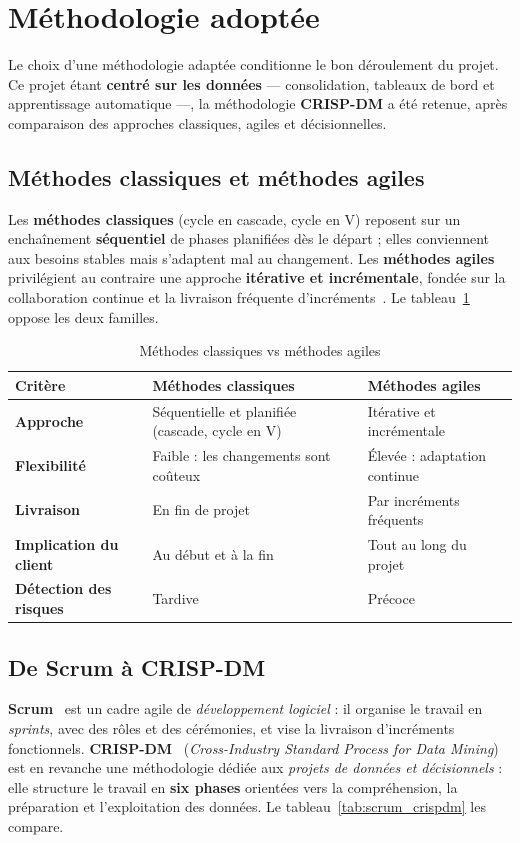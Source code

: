 \section{Méthodologie adoptée}
Le choix d'une méthodologie adaptée conditionne le bon déroulement du projet. Ce
projet étant \textbf{centré sur les données} --- consolidation, tableaux de bord et
apprentissage automatique ---, la méthodologie \textbf{CRISP-DM} a été retenue,
après comparaison des approches classiques, agiles et décisionnelles.

\subsection{Méthodes classiques et méthodes agiles}
Les \textbf{méthodes classiques} (cycle en cascade, cycle en V) reposent sur un
enchaînement \textbf{séquentiel} de phases planifiées dès le départ ; elles
conviennent aux besoins stables mais s'adaptent mal au changement. Les
\textbf{méthodes agiles} privilégient au contraire une approche \textbf{itérative et
incrémentale}, fondée sur la collaboration continue et la livraison fréquente
d'incréments~\cite{schwaber2020scrum}. Le tableau~\ref{tab:classique_agile} oppose
les deux familles.

\begin{table}[htbp]
\centering
\caption{Méthodes classiques vs méthodes agiles}
\label{tab:classique_agile}
\renewcommand{\arraystretch}{1.2}
\begin{tabularx}{\textwidth}{|>{\bfseries}p{3cm}|X|X|}
\hline
\textmd{\textbf{Critère}} & \textbf{Méthodes classiques} & \textbf{Méthodes agiles}\\
\hline
Approche & Séquentielle et planifiée (cascade, cycle en V) & Itérative et incrémentale\\
\hline
Flexibilité & Faible : les changements sont coûteux & Élevée : adaptation continue\\
\hline
Livraison & En fin de projet & Par incréments fréquents\\
\hline
Implication du client & Au début et à la fin & Tout au long du projet\\
\hline
Détection des risques & Tardive & Précoce\\
\hline
\end{tabularx}
\end{table}

\subsection{De Scrum à CRISP-DM}
\textbf{Scrum}~\cite{schwaber2020scrum} est un cadre agile de \emph{développement
logiciel} : il organise le travail en \emph{sprints}, avec des rôles et des
cérémonies, et vise la livraison d'incréments fonctionnels.
\textbf{CRISP-DM}~\cite{chapman2000crispdm} (\emph{Cross-Industry Standard Process
for Data Mining}) est en revanche une méthodologie dédiée aux \emph{projets de
données et décisionnels} : elle structure le travail en \textbf{six phases}
orientées vers la compréhension, la préparation et l'exploitation des données. Le
tableau~\ref{tab:scrum_crispdm} les compare.

